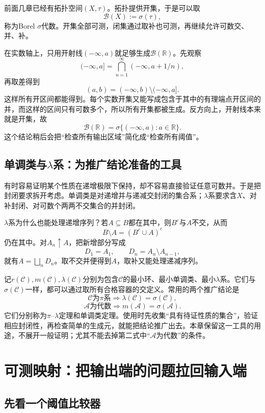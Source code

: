 前面几章已经有拓扑空间$(X,\tau)$。拓扑提供开集，于是可以取
\[
 \mathcal B(X):=\sigma(\tau),
\]
称为Borel $\sigma$代数。开集全部可测，闭集通过取补也可测，再继续允许可数交、并、补。

在实数轴上，只用开射线$(-\infty,a)$就足够生成$\mathcal B(\mathbb R)$。先观察
\[
 (-\infty,a]=\bigcap_{n=1}^{\infty}(-\infty,a+1/n),
\]
再取差得到
\[
 (a,b)=(-\infty,b)\setminus(-\infty,a].
\]
这样所有开区间都能得到。每个实数开集又能写成包含于其中的有理端点开区间的并，而这样的区间只有可数多个，所以所有开集都被生成。反方向上，开射线本来就是开集，故
\[
 \mathcal B(\mathbb R)=\sigma\{(-\infty,a):a\in\mathbb R\}.
\]
这个结论稍后会把“检查所有输出区域”简化成“检查所有阈值”。

\subsection{单调类与\texorpdfstring{$\lambda$}{lambda}系：为推广结论准备的工具}

有时容易证明某个性质在递增极限下保持，却不容易直接验证任意可数并。于是把封闭要求拆开考虑。单调类是对递增并与递减交封闭的集合系；$\lambda$系要求含$X$、对补封闭、对可数个两两不交集合的并封闭。

$\lambda$系为什么也能处理递增序列？若$A\subseteq B$都在其中，则$B^c$与$A$不交，从而
\[
 B\setminus A=(B^c\cup A)^c
\]
仍在其中。对$A_n\uparrow A$，把新增部分写成
\[
 D_1=A_1,\qquad D_n=A_n\setminus A_{n-1},
\]
就有$A=\bigsqcup_nD_n$。取不交并便得到$A$，取补又能处理递减序列。

记$r(\mathcal C),m(\mathcal C),\lambda(\mathcal C)$分别为包含$\mathcal C$的最小环、最小单调类、最小$\lambda$系。它们与$\sigma(\mathcal C)$一样，都可以通过取所有合格容器的交定义。常用的两个推广结论是
\[
 \mathcal C\text{为}\pi\text{系}\Rightarrow
       \lambda(\mathcal C)=\sigma(\mathcal C),
\]
\[
 \mathcal A\text{为代数}\Rightarrow
       m(\mathcal A)=\sigma(\mathcal A).
\]
它们分别称为$\pi$--$\lambda$定理和单调类定理。使用时先收集“具有待证性质的集合”，验证相应封闭性，再检查简单的生成元，就能把结论推广出去。本章保留这一工具的用途，不展开一般证明；尤其不能去掉第二式中“$\mathcal A$为代数”的条件。

\section{可测映射：把输出端的问题拉回输入端}

\subsection{先看一个阈值比较器}

